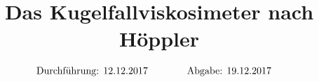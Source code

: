 

\subject{v107}
\title{Das Kugelfallviskosimeter nach Höppler}

\date{
  \begin{align}
    \text{Durchführung: } & \text{12.12.2017} & \hspace{3em} & \text{Abgabe: 19.12.2017} \notag
  \end{align}
}




\maketitle
\thispagestyle{empty}
\tableofcontents
\newpage






\printbibliography{}


